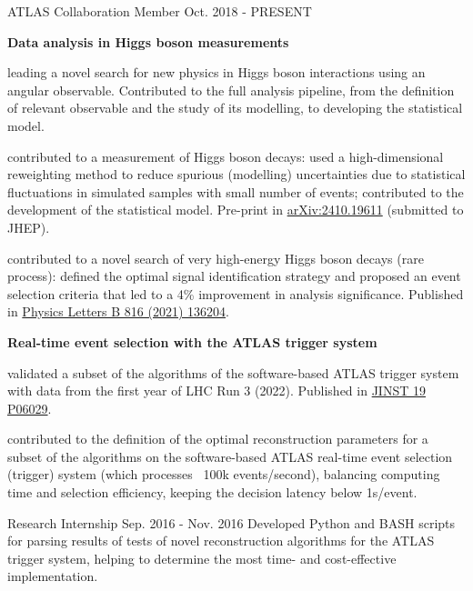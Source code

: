 \begin{cventries}
    \cventry
    {ATLAS Collaboration}
    {Member}
    {}
    {Oct. 2018 - PRESENT}
    {
        \textbf{Data analysis in Higgs boson measurements}\vspace{14pt}
        \begin{cvitems}
            \item {leading a novel search for new physics in Higgs boson interactions using an angular observable. Contributed to the full analysis pipeline, from the definition of relevant observable and the study of its modelling, to developing the statistical model.}
            \item {contributed to a measurement of Higgs boson decays: used a high-dimensional reweighting method to reduce spurious (modelling) uncertainties due to statistical fluctuations in simulated samples with small number of events; contributed to the development of the statistical model. Pre-print in \href{https://arxiv.org/abs/2410.19611}{arXiv:2410.19611} (submitted to JHEP).}
            \item {contributed to a novel search of very high-energy Higgs boson decays (rare process): defined the optimal signal identification strategy and proposed an event selection criteria that led to a 4\% improvement in analysis significance. Published in \href{https://doi.org/10.1016/j.physletb.2021.136204}{Physics Letters B 816 (2021) 136204}.}
        \end{cvitems}\vspace{19pt}
        \textbf{Real-time event selection with the ATLAS trigger system}\vspace{14pt}
        \begin{cvitems}
            \item {validated a subset of the algorithms of the software-based ATLAS trigger system with data from the first year of LHC Run 3 (2022). Published in \href{https://doi.org/10.1088/1748-0221/19/06/P06029}{JINST 19 P06029}.}
            \item {contributed to the definition of the optimal reconstruction parameters for a subset of the algorithms on the software-based ATLAS real-time event selection (trigger) system (which processes ~100k events/second), balancing computing time and selection efficiency, keeping the decision latency below 1s/event.}
        \end{cvitems}
    }

    {Research Internship}
    {}
    {Sep. 2016 - Nov. 2016}
    {Developed Python and BASH scripts for parsing results of tests of novel reconstruction algorithms for the ATLAS trigger system, helping to determine the most time- and cost-effective implementation.}


\end{cventries}
